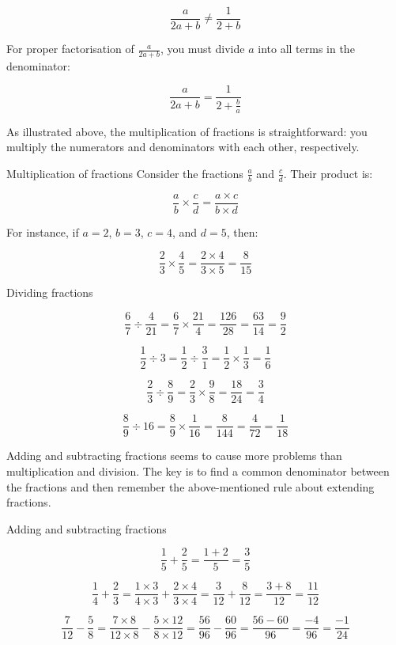 \[
\frac{a}{2a + b} \neq \frac{1}{2 + b}
\]

For proper factorisation of \(\frac{a}{2a + b}\), you must divide \(a\) into all terms in the denominator:

\[
\frac{a}{2a + b} = \frac{1}{2 + \frac{b}{a}}
\]

As illustrated above, the multiplication of fractions is straightforward: you multiply the numerators and denominators with each other, respectively.

\begin{example} Multiplication of fractions \newline
Consider the fractions \(\frac{a}{b}\) and \(\frac{c}{d}\). Their product is:

\[
\frac{a}{b} \times \frac{c}{d} = \frac{a \times c}{b \times d}
\]

For instance, if \(a = 2\), \(b = 3\), \(c = 4\), and \(d = 5\), then:

\[
\frac{2}{3} \times \frac{4}{5} = \frac{2 \times 4}{3 \times 5} = \frac{8}{15}
\]
  
\end{example} 

\begin{example} Dividing fractions

\[
\frac{6}{7} \div \frac{4}{21} = \frac{6}{7} \times \frac{21}{4} = \frac{126}{28} = \frac{63}{14} = \frac{9}{2}
\]

\[
\frac{1}{2} \div 3 = \frac{1}{2} \div \frac{3}{1} = \frac{1}{2} \times \frac{1}{3} = \frac{1}{6}
\]

\[
\frac{2}{3} \div \frac{8}{9} = \frac{2}{3} \times \frac{9}{8} = \frac{18}{24} = \frac{3}{4}
\]

\[
\frac{8}{9} \div 16 = \frac{8}{9} \times \frac{1}{16} = \frac{8}{144} = \frac{4}{72} = \frac{1}{18}
\]
  
\end{example}

Adding and subtracting fractions seems to cause more problems than multiplication and division. The key is to find a common denominator between the fractions and then remember the above-mentioned rule about extending fractions.

\begin{example} Adding and subtracting fractions

 \[
\frac{1}{5} + \frac{2}{5} = \frac{1 + 2}{5} = \frac{3}{5}
\]

\[
\frac{1}{4} + \frac{2}{3} = \frac{1 \times 3}{4 \times 3} + \frac{2 \times 4}{3 \times 4} = \frac{3}{12} + \frac{8}{12} = \frac{3 + 8}{12} = \frac{11}{12}
\]

\[
\frac{7}{12} - \frac{5}{8} = \frac{7 \times 8}{12 \times 8} - \frac{5 \times 12}{8 \times 12} = \frac{56}{96} - \frac{60}{96} = \frac{56 - 60}{96} = \frac{-4}{96} = \frac{-1}{24}
\]

\end{example}

